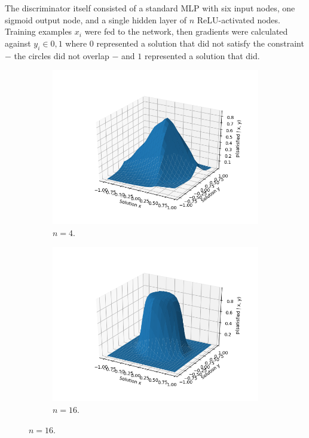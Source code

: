 \documentclass[a4paper]{article}
\begin{document}
The discriminator itself consisted of a standard MLP with six input nodes, one sigmoid output node, and a single hidden layer of $n$ ReLU-activated nodes.
Training examples $x_i$ were fed to the network, then gradients were calculated against $y_i \in 0, 1$ where $0$ represented a solution
that did not satisfy the constraint $-$ the circles did not overlap $-$ and $1$ represented a solution that did.

\begin{figure}
\centering
  \begin{subfigure}[a]{.8\linewidth}
    \includegraphics[width=.8\linewidth]{../../figures/artificial-discriminator-predicted-objective-function-4-hidden-nodes.png}
    \caption{$n = 4$.}
  \end{subfigure}
  \begin{subfigure}[a]{.8\linewidth}
    \includegraphics[width=.8\linewidth]{../../figures/artificial-discriminator-predicted-objective-function-16-hidden-nodes.png}
    \caption{$n = 16$.}
  \end{subfigure}

\end{figure}
\end{document}
